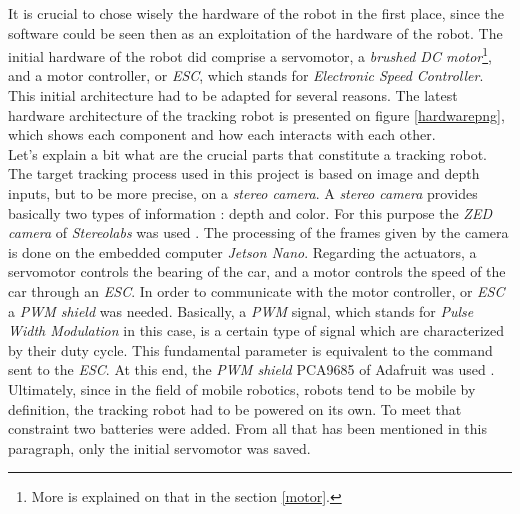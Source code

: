 		It is crucial to chose wisely the hardware of the robot in the first place, since
		the software could be seen then as an exploitation of the hardware of 
		the robot. The initial hardware of the robot did comprise
		a servomotor, a \textit{brushed DC motor}\footnote{More is explained 
		on that in the section \vref{motor}.}, and a motor controller, or \textit{ESC}, which
		stands for \textit{ Electronic Speed Controller}.
		\\\indent This initial architecture had to be adapted for several reasons.
		The latest hardware architecture of the tracking robot is
		presented on figure \vref{hardwarepng}, which
		shows each component and how each interacts with each other.
		\\\indent Let's explain a bit what are the crucial parts
		that constitute a tracking robot. The target tracking process used
		in this project is based on image and depth inputs, but to be more
		precise, on a \textit{stereo camera}. A \textit{stereo camera}
		provides basically two types of information : depth and color.
		For this purpose the \textit{ZED camera} of \textit{Stereolabs}
		was used \cite{zeddoc}. The processing of the frames
		given by the camera is done on the embedded computer
		\textit{Jetson Nano}. Regarding the actuators, a servomotor
		controls the bearing of the car, and a motor controls the speed
		of the car through an \textit{ESC}. In order to communicate
		with the motor controller, or \textit{ESC} a \textit{PWM shield}
		was needed. Basically, a \textit{PWM} signal, which stands for
		\textit{Pulse Width Modulation} in this case, is a certain type
		of signal which are characterized by their duty cycle. This 
		fundamental parameter is equivalent to the command sent 
		to the \textit{ESC}. At this end, the \textit{PWM shield} PCA9685
		of Adafruit was used \cite{adafruitpwm}. Ultimately, since
		in the field of mobile robotics, robots tend to be mobile by definition,
		the tracking robot had to be powered on its own. To 
		meet that constraint two batteries were added. From all that has
		been mentioned in this paragraph, only the initial servomotor was
		saved.
		
		\FloatBarrier

